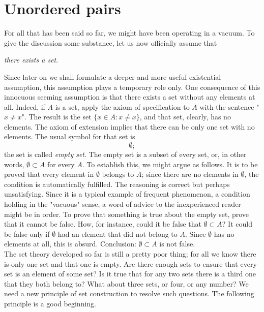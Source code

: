 \section{Unordered pairs}

For all that has been said so far, we might have been operating in a vacuum. To give the discussion some substance, let us now officially assume that
\begin{center}
	\textit{there exists a set}.
\end{center}
Since later on we shall formulate a deeper and more useful existential assumption, this assumption plays a temporary role only. One consequence of this innocuous seeming assumption is that there exists a set without any elements at all. Indeed, if $A$ is a set, apply the axiom of specification to $A$ with the sentence "$x \neq x$". The result is the set $\{x \in A :x \neq x\}$, and that set, clearly, has no elements. The axiom of extension implies that there can be only one set with no elements. The usual symbol for that set is
\[
	\emptyset;
\]
the set is called \textit{empty set}. The empty set is a subset of every set, or, in other words, $\emptyset \subset A$ for every $A$. To establish this, we might argue as follows. It is to be proved that every element in $\emptyset$ belongs to $A$; since there are no elements in $\emptyset$, the condition is automatically fulfilled. The reasoning is correct but perhaps unsatisfying. Since it is a typical example of frequent phenomenon, a condition holding in the "vacuous" sense, a word of advice to the inexperienced reader might be in order. To prove that something is true about the empty set, prove that it cannot be false. How, for instance, could it be false that $\emptyset \subset A$? It could be false only if $\emptyset$ had an element that did not belong to $A$. Since $\emptyset$ has no elements at all, this is absurd. Conclusion: $\emptyset \subset A$ is not false.\\

The set theory developed so far is still a pretty poor thing; for all we know there is only one set and that one is empty. Are there enough sets to ensure that every set is an element of some set? Is it true that for any two sets there is a third one that they both belong to? What about three sets, or four, or any number? We need a new principle of set construction to resolve such questions. The following principle is a good beginning.


